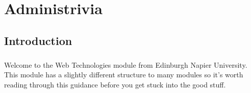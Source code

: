 \chapter{Administrivia}

\section{Introduction}
\label{intro}

\paragraph{} Welcome to the Web Technologies module from Edinburgh Napier University. This module has a slightly different structure to many modules so it's worth reading through this guidance before you get stuck into the good stuff.


